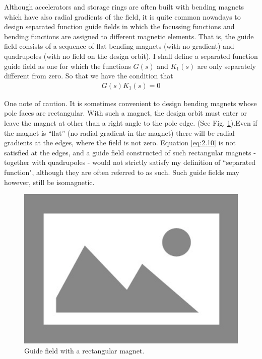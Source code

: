 Although accelerators and storage rings are often built with bending magnets which have also radial gradients of the field, it is quite common nowadays to design separated function guide fields in which the focussing functions and bending functions are assigned to different magnetic elements. That is, the guide field consists of a sequence of flat bending magnets (with no gradient) and quadrupoles (with no field on the design orbit). I shall define a separated function guide field as one for which the functions $G(s)$ and $K_1(s)$ are only separately different from zero. So that we have the condition that
\begin{align}
	G(s)K_1(s) = 0\label{eq:2.10}
\end{align}

One note of caution. It is sometimes convenient to design bending magnets whose pole faces are rectangular. With such a magnet, the design orbit must enter or leave the magnet at other than a right angle to the pole edge. (See Fig. \ref{fig:fig8}).Even if the magnet is “flat” (no radial gradient in the magnet) there will be radial gradients at the edges, where the field is not zero. Equation \eqref{eq:2.10} is not satisfied at the edges, and a guide field constructed of such rectangular magnets - together with quadrupoles - would not strictly satisfy my definition of “separated function", although they are often referred to as such. Such guide fields may however, still be isomagnetic.

\begin{figure}[!htb]
	\centering
	\includegraphics[width=0.6\linewidth]{./Figuras/placeholder.png}
	\caption{Guide field with a rectangular magnet.}
	\label{fig:fig8}
\end{figure}